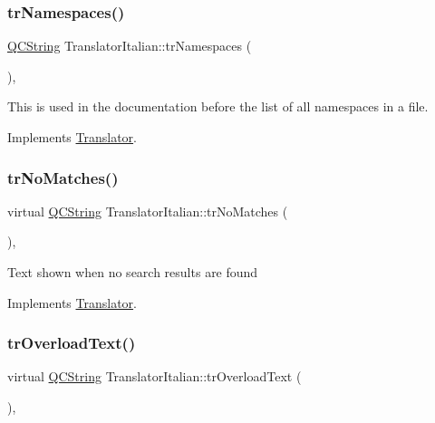 \subsubsection{\texorpdfstring{trNamespaces()}{trNamespaces()}}
{\footnotesize\ttfamily \mbox{\hyperlink{class_q_c_string}{Q\+C\+String}} Translator\+Italian\+::tr\+Namespaces (\begin{DoxyParamCaption}{ }\end{DoxyParamCaption})\hspace{0.3cm}{\ttfamily [inline]}, {\ttfamily [virtual]}}

This is used in the documentation before the list of all namespaces in a file. 

Implements \mbox{\hyperlink{class_translator}{Translator}}.

\mbox{\label{class_translator_italian_aeb4fccbcab8c8472bc6436141399e2c7}} 
\subsubsection{\texorpdfstring{trNoMatches()}{trNoMatches()}}
{\footnotesize\ttfamily virtual \mbox{\hyperlink{class_q_c_string}{Q\+C\+String}} Translator\+Italian\+::tr\+No\+Matches (\begin{DoxyParamCaption}{ }\end{DoxyParamCaption})\hspace{0.3cm}{\ttfamily [inline]}, {\ttfamily [virtual]}}

Text shown when no search results are found 

Implements \mbox{\hyperlink{class_translator}{Translator}}.

\mbox{\label{class_translator_italian_a13707f53da74bddea1e2a365e3c381e0}} 
\subsubsection{\texorpdfstring{trOverloadText()}{trOverloadText()}}
{\footnotesize\ttfamily virtual \mbox{\hyperlink{class_q_c_string}{Q\+C\+String}} Translator\+Italian\+::tr\+Overload\+Text (\begin{DoxyParamCaption}{ }\end{DoxyParamCaption})\hspace{0.3cm}{\ttfamily [inline]}, {\ttfamily [virtual]}}


